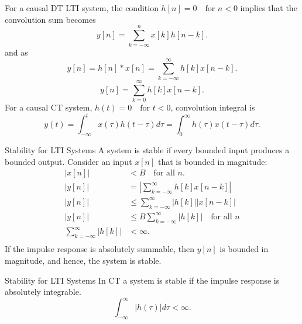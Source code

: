 \begin{frame}
    For a causal DT LTI system, the condition $h[n] = 0\quad \text{for } n < 0$ implies that the convolution sum becomes
        \begin{equation*}
            y[n] = \sum_{k=-\infty}^{n}x[k]h[n-k].
        \end{equation*}
    and as
    \begin{equation*}
        y[n] = h[n]\ast x[n] = \sum_{k=-\infty}^{\infty}h[k]x[n-k].
    \end{equation*}
    \begin{equation*}
        y[n] = \sum_{k=0}^{\infty}h[k]x[n-k].
    \end{equation*}
    \pause
    For a causal CT system, $h(t) = 0\quad \text{for } t < 0$, convolution integral is
    \begin{equation*}
        y(t) = \int_{-\infty}^{t}x(\tau)h(t - \tau)d\tau = \int_{0}^{\infty}h(\tau)x(t - \tau)d\tau.
    \end{equation*}
\end{frame}

\begin{frame}{Stability for LTI Systems}
A system is stable if every bounded input produces a bounded output. Consider an input $x[n]$ that is bounded in magnitude:
    \begin{align*}
        |x[n]| &< B \quad \text{for all } n.\\
      |y[n]| &= \left| \sum_{k=-\infty}^{\infty}h[k]x[n-k]\right| \\
      |y[n]| &\leq  \sum_{k=-\infty}^{\infty}|h[k]||x[n-k]|\\
      |y[n]| &\leq  B\sum_{k=-\infty}^{\infty}|h[k]|\quad \text{for all } n\\
      \sum_{k=-\infty}^{\infty}|h[k]| &< \infty.\\
    \end{align*}
    If the impulse response is absolutely summable, then $y[n]$ is bounded in magnitude, and hence, the system is stable.

\end{frame}

\begin{frame}{Stability for LTI Systems}
    In CT a system is stable if the impulse response is \alert{absolutely integrable}.
    \begin{equation*}
        \int_{-\infty}^{\infty}|h(\tau)|d\tau < \infty.
    \end{equation*}
\end{frame}




